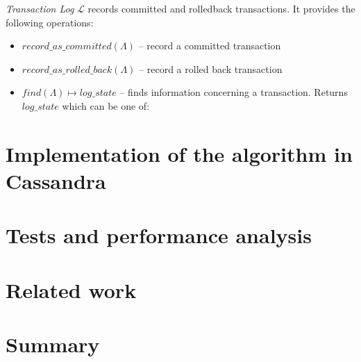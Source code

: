\documentclass[runningheads,a4paper]{llncs}
\newcommand{\txLog}{$\mathcal{L}$\xspace}
\newcommand{\txState}{$\Lambda$\xspace}
\begin{document}
\begin{definition}
\label{def:transactionLog}
\emph{Transaction Log} \txLog records committed and rolledback transactions. It provides the following operations:
\begin{itemize}
\item $\mathit{record\_as\_committed(\text{\txState})}$ -- record a committed transaction
\item $\mathit{record\_as\_rolled\_back(\text{\txState})}$ -- record a rolled back transaction
\item $\mathit{find(\text{\txState})} \mapsto \mathit{log\_state}$ -- finds information concerning a transaction. Returns $\mathit{log\_state}$ which can be one of:  
\end{itemize}

\end{definition}

\section{Implementation of the algorithm in Cassandra}

\section{Tests and performance analysis}

\section{Related work}


\section{Summary}



 
\end{document}
